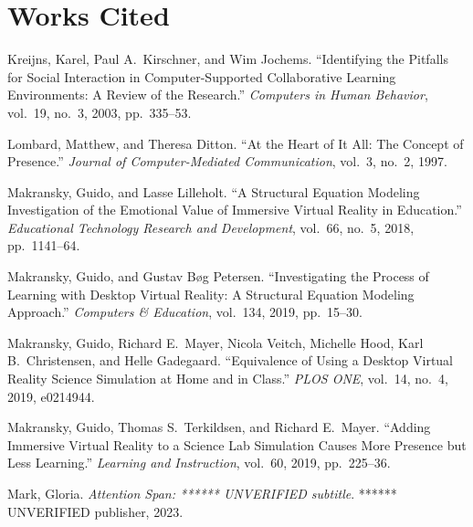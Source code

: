 \documentclass{article}
\newenvironment{workscited}
  {\section*{Works Cited}\begin{list}{}
    {\setlength{\itemindent}{-0.5in}\setlength{\leftmargin}{0.5in}
     \setlength{\itemsep}{0pt}\setlength{\parsep}{6pt}}}
  {\end{list}}
\begin{document}
\begin{workscited}
\item Kreijns, Karel, Paul A.\ Kirschner, and Wim Jochems. ``Identifying
the Pitfalls for Social Interaction in Computer-Supported Collaborative
Learning Environments: A Review of the Research.'' \textit{Computers in
Human Behavior}, vol.~19, no.~3, 2003, pp.~335--53. %

\item Lombard, Matthew, and Theresa Ditton. ``At the Heart of It All: The
Concept of Presence.'' \textit{Journal of Computer-Mediated
Communication}, vol.~3, no.~2, 1997. %

\item Makransky, Guido, and Lasse Lilleholt. ``A Structural Equation
Modeling Investigation of the Emotional Value of Immersive Virtual
Reality in Education.'' \textit{Educational Technology Research and
Development}, vol.~66, no.~5, 2018, pp.~1141--64.

\item Makransky, Guido, and Gustav B{\o}g Petersen. ``Investigating the
Process of Learning with Desktop Virtual Reality: A Structural Equation
Modeling Approach.'' \textit{Computers \& Education}, vol.~134, 2019,
pp.~15--30. %

\item Makransky, Guido, Richard E.\ Mayer, Nicola Veitch, Michelle Hood,
Karl B.\ Christensen, and Helle Gadegaard. ``Equivalence of Using a
Desktop Virtual Reality Science Simulation at Home and in Class.''
\textit{PLOS ONE}, vol.~14, no.~4, 2019, e0214944.

\item Makransky, Guido, Thomas S.\ Terkildsen, and Richard E.\ Mayer.
``Adding Immersive Virtual Reality to a Science Lab Simulation Causes
More Presence but Less Learning.'' \textit{Learning and Instruction},
vol.~60, 2019, pp.~225--36. %

\item Mark, Gloria. \textit{Attention Span: ****** UNVERIFIED subtitle}.
****** UNVERIFIED publisher, 2023.


\end{workscited}
\end{document}
